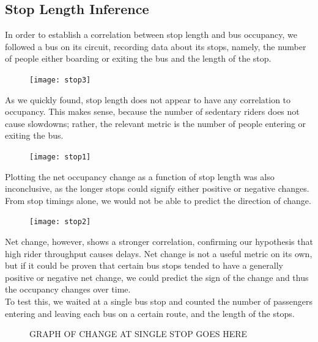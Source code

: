 \documentclass[letterpaper,abstract=on,titlepage=false]{scrreprt}
\begin{document}
\subsection*{Stop Length Inference}
	In order to establish a correlation between stop length and bus occupancy, we followed a bus on its circuit, recording data about its stops, namely, the number of people either boarding or exiting the bus and the length of the stop.
	\begin{figure}[H]
	\texttt{[image: stop3]}
	\centering
	\end{figure}
	As we quickly found, stop length does not appear to have any correlation to occupancy.
	This makes sense, because the number of sedentary riders does not cause slowdowns; rather, the relevant metric is the number of people entering or exiting the bus.

	\begin{figure}[H]
	\texttt{[image: stop1]}
	\centering
	\end{figure}

	Plotting the net occupancy change as a function of stop length was also inconclusive, as the longer stops could signify either positive or negative changes.
	From stop timings alone, we would not be able to predict the direction of change.

	\begin{figure}[H]
	\texttt{[image: stop2]}
	\centering
	\end{figure}

	Net change, however, shows a stronger correlation, confirming our hypothesis that high rider throughput causes delays.
	Net change is not a useful metric on its own, but if it could be proven that certain bus stops tended to have a generally positive or negative net change, we could predict the sign of the change and thus the occupancy changes over time.
	\\
	To test this, we waited at a single bus stop and counted the number of passengers entering and leaving each bus on a certain route, and the length of the stops.

	\begin{figure}[H]
	GRAPH OF CHANGE AT SINGLE STOP GOES HERE
	\centering
	\end{figure}
\end{document}
